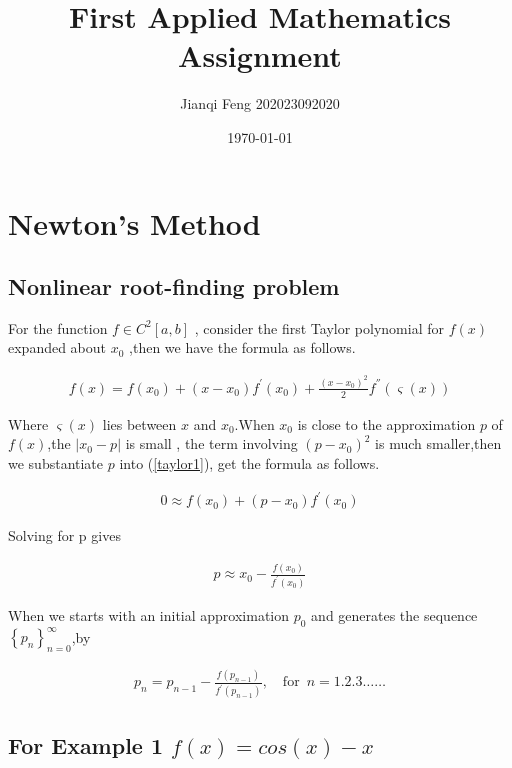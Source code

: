 \documentclass{article}
\title{\vspace{+4cm}\textbf{First Applied Mathematics Assignment}}
\author{Jianqi Feng 202023092020}
\date{\today}
\begin{document}
\maketitle
\newpage
{}
\setcounter{page}{0}
\tableofcontents

\newpage
\setcounter{page}{1}


\section{Newton's Method}
\subsection{Nonlinear root-finding problem}
\setlength{\parindent}{2em}For the function $ f \in C^{2}[a,b]$ , consider the first Taylor polynomial for $f(x)$ expanded about $x_0$\cite{ref1} ,then we have the formula as follows.

\begin{align}
f(x) = f(x_0) + (x-x_0)f^{'}(x_0) + \frac{(x-x_0)^2}{2}f^{''}(\varsigma(x))
\label{taylor1}
\end{align}

Where $\varsigma(x)$ lies between $x$ and $x_0$.When $x_0$ is close to the approximation $p$ of $f(x)$,the $|x_0-p|$ is small , the term involving $(p-x_0)^2$ is much smaller,then we substantiate $p$ into (\ref{taylor1}), get the formula as follows.

\begin{align}
0 \approx f(x_0) + (p-x_0)f^{'}(x_0) \nonumber
\end{align}

Solving for p gives

\begin{align}
p\approx x_0 - \frac{f(x_0)}{f^{'}(x_0)}
\end{align}

When we starts with an initial approximation $p_0$ and generates the sequence $\left\{ p_n \right\}_{n=0}^{\infty}$,by

\begin{align}
p_n = p_{n-1} - \frac{f(p_{n-1})}{f^{'}(p_{n-1})} ,\quad \text{for} \enspace n=1.2.3……
\label{taylor2}
\end{align}

\subsection{For Example 1 $f(x) = cos(x)-x$}
\end{document}

